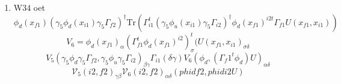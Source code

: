 \documentclass{article}[12pt]
\begin{document}
\begin{itemize}
\begin{enumerate}
$$$$
$$
W_{34\alpha,\beta}=\Gamma_{i1}\left(\gamma,\delta\right){\mathcal V}_{3}\left(\gamma_5\phi,\Gamma_{f2},U\right)^{n}_{\beta}{\mathcal V}_{4}\left(\gamma_5\xi,\Gamma_{f1}U,T_{fii}^{dd}\right)^{n}_{\alpha,\delta,\gamma}
$$
\item W34 oet
$$
\phi_d(x_{f1})(\gamma_5\phi_d(x_{i1})\gamma_5\Gamma_{f2})^\dagger
\mathrm{Tr}(\Gamma_{i1}^t(\gamma_5\phi_u(x_{i1})\gamma_5\Gamma_{i2})^\dagger \phi_d(x_{f1})^{i2t}\Gamma_{f1}U(x_{f1},x_{i1}))
$$
$$
V_6=\phi_d(x_{f1})_{\alpha}(\Gamma_{f1}^t\phi_d(x_{f1})^{i2})^t_{\sigma}(U(x_{f1},x_{i1})_{\sigma\delta}
$$
$$
V_5(\gamma_5\phi_d\gamma_5\Gamma_{f2},\gamma_5\phi_u\gamma_5\Gamma_{i2})_{\beta\gamma}\Gamma_{i1}(\delta\gamma)V_6(\phi_d, (\Gamma_f1^t\phi_d)U)_{\alpha\delta}
$$
$$
{\mathcal V}_5(i2,f2)_{\gamma\beta}{\mathcal V}_6(i2,f2)_{\alpha\delta}(phidf2,phidi2U)
$$


\end{enumerate}
\end{itemize}
\end{document}
